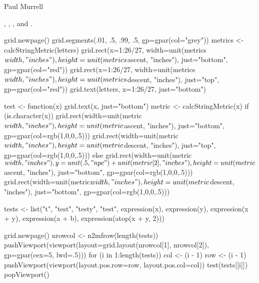 %
\begin{Author}\relax
 Paul Murrell 
\end{Author}
%
\begin{SeeAlso}\relax
 , ,
, and .
\end{SeeAlso}
%
\begin{Examples}
\begin{ExampleCode}
grid.newpage()
grid.segments(.01, .5, .99, .5, gp=gpar(col="grey"))
metrics <- calcStringMetric(letters)
grid.rect(x=1:26/27,
          width=unit(metrics$width, "inches"),
          height=unit(metrics$ascent, "inches"),
          just="bottom",
          gp=gpar(col="red"))
grid.rect(x=1:26/27,
          width=unit(metrics$width, "inches"),
          height=unit(metrics$descent, "inches"),
          just="top",
          gp=gpar(col="red"))
grid.text(letters, x=1:26/27, just="bottom")

test <- function(x) {
    grid.text(x, just="bottom")
    metric <- calcStringMetric(x)
    if (is.character(x)) {
        grid.rect(width=unit(metric$width, "inches"),
                  height=unit(metric$ascent, "inches"),
                  just="bottom",
                  gp=gpar(col=rgb(1,0,0,.5)))
        grid.rect(width=unit(metric$width, "inches"),
                  height=unit(metric$descent, "inches"),
                  just="top",
                  gp=gpar(col=rgb(1,0,0,.5)))
    } else {
        grid.rect(width=unit(metric$width, "inches"),
                  y=unit(.5, "npc") + unit(metric[2], "inches"),
                  height=unit(metric$ascent, "inches"),
                  just="bottom",
                  gp=gpar(col=rgb(1,0,0,.5)))
        grid.rect(width=unit(metric$width, "inches"),
                  height=unit(metric$descent, "inches"),
                  just="bottom",
                  gp=gpar(col=rgb(1,0,0,.5)))        
    }
}

tests <- list("t",
              "test",
              "testy",
              "test\ntwo",
              expression(x),
              expression(y),
              expression(x + y),
              expression(a + b),
              expression(atop(x + y, 2)))

grid.newpage()
nrowcol <- n2mfrow(length(tests))
pushViewport(viewport(layout=grid.layout(nrowcol[1], nrowcol[2]),
                      gp=gpar(cex=5, lwd=.5)))
for (i in 1:length(tests)) {
    col <- (i - 1) %
    row <- (i - 1) %
    pushViewport(viewport(layout.pos.row=row, layout.pos.col=col))
    test(tests[[i]])
    popViewport()
}

\end{ExampleCode}
\end{Examples}
